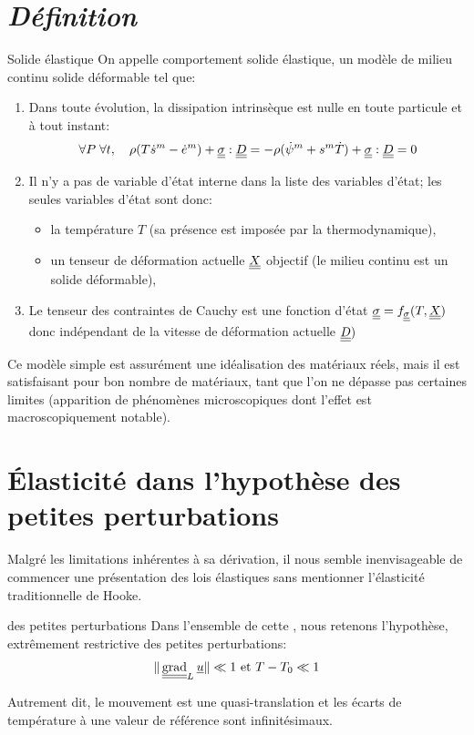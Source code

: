 \documentclass[10pt]{book}
\begin{document}
\begin{appendices}
\section*{\emph{Définition}}
\begin{Defi}{Solide élastique}\label{Defi:Solide_elastique} On appelle comportement solide élastique, un modèle de milieu continu solide déformable tel que:
\begin{enumerate}[label=\arabic*)]
\item Dans toute évolution, la dissipation intrinsèque est nulle en toute particule et à tout instant:
\begin{equation}
\forall P \; \forall t,\quad \rho (T\dot{s}^{m}-\dot{e}^{m})+\underline{\underline{\sigma}}:\underline{\underline{D}}=-\rho(\dot{\psi}^{m}+s^{m}\dot{T})+\underline{\underline{\sigma}}:\underline{\underline{D}}=0
\label{Nullite_dissip_intrins_gen}
\end{equation}
\item Il n'y a pas de variable d'état interne dans la liste des variables d'état; les seules variables d'état sont donc:
\begin{itemize}[label=-]
\item la température $T$ (sa présence est imposée par la thermodynamique),
\item un tenseur de déformation actuelle $\underline{\underline{X}}$ objectif (le milieu continu est un solide déformable),
\end{itemize}
\item\label{point:3_defi_elast} Le tenseur des contraintes de Cauchy est une fonction d'état $\underline{\underline{\sigma}}=f_{\underline{\underline{\sigma}}}(T,\underline{\underline{X}})$donc indépendant de la vitesse de déformation actuelle $\underline{\underline{D}})$
\end{enumerate}
\label{Defi_Solide_elast}
\end{Defi}
Ce modèle simple est assurément une idéalisation des matériaux réels, mais il est satisfaisant pour bon nombre de matériaux, tant que l'on ne dépasse pas certaines limites (apparition de phénomènes microscopiques dont l'effet est macroscopiquement notable). 
\clearpage
\section{Élasticité dans l'hypothèse des petites perturbations}\label{Section:Élasticité dans l'hypothèse des petites perturbations}
Malgré les limitations inhérentes à sa dérivation, il nous semble inenvisageable de commencer une présentation des lois élastiques sans mentionner l'élasticité traditionnelle de Hooke.\\
\begin{Hypothese}{des petites perturbations} Dans l'ensemble de cette , nous retenons l'hypothèse, extrêmement restrictive des petites perturbations:
$$\Vert\tgrad_{L}\Dep\Vert\ll 1 \et T-T_{0}\ll 1$$
\end{Hypothese}
Autrement dit, le mouvement est une quasi-translation et les écarts de température à une valeur de référence sont infinitésimaux.

\end{appendices}
\end{document}
